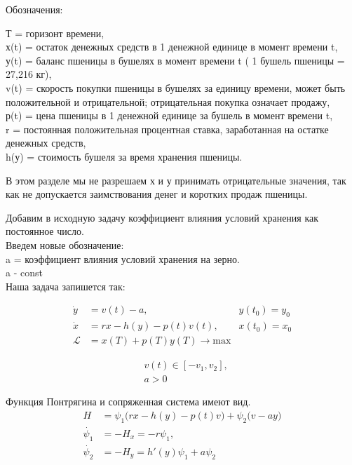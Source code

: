 Обозначения:
 

{Т} = горизонт времени,\\
{х(t)} = остаток денежных средств в 1 денежной единице в момент времени t,\\
{у(t)} = баланс пшеницы в бушелях в момент времени t ( 1 бушель пшеницы = 27,216 кг),\\ 
{v(t)} = скорость покупки пшеницы в бушелях за единицу времени, может быть положительной и отрицательной; отрицательная покупка означает продажу,\\
{р(t)} = цена пшеницы в  1 денежной единице за бушель в момент времени t,\\
{r} = постоянная положительная процентная ставка, заработанная на остатке денежных средств,\\
{h(у)} = стоимость бушеля за время хранения пшеницы.
 
В этом разделе мы не разрешаем {х} и {у} принимать отрицательные значения, так как не допускается заимствования денег и коротких продаж пшеницы.


Добавим в исходную задачу коэффициент влияния условий хранения как постоянное число.\\

Введем новые обозначение:\\
{a} = коэффициент влияния условий хранения на зерно.\\
a - const\\
Наша задача запишется так:

\begin{align}
    \Dot{y} & = v(t) - a, & y(t_{0}) = y_{0} \\
    \Dot{x} & = r x - h(y) - p(t) v(t), & x(t_{0}) = x_{0} \\
    \mathcal{L} & = x(T) + p(T) y(T) \to \mathrm{max}
\end{align}

\begin{align}
    & v(t) \in [-v_{1}, v_{2}], \\
    & a > 0
\end{align}

Функция Понтрягина и сопряженная система имеют вид. 
\begin{align}
    {H} & = \psi_{1} \big( r x- h(y) - p(t) v \big) + \psi_{2} \big( v - a y \big)\\
    \Dot{\psi_{1}} & = -H_x = -r \psi_{1},\\
    \Dot{\psi_{2}} & = -H_y = h'(y) \psi_{1} +  a \psi_{2}
\end{align} 

